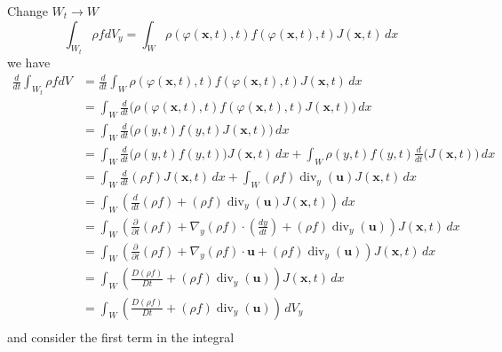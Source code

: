 Change $W_t \to W$
\begin{equation}
\int_{W_t} \rho f dV_y = \int_W \rho (\varphi(\textbf{x},t), t) f(\varphi(\textbf{x},t), t) J(\textbf{x},t)\, dx
\end{equation}
we have
\begin{equation}
\begin{aligned}
\frac{d}{dt}\int_{W_t} \rho f dV
&= \frac{d}{dt} \int_W \rho (\varphi(\textbf{x},t), t) f(\varphi(\textbf{x},t), t) J(\textbf{x},t)\, dx\\
&= \int_W \frac{d}{dt} \bigg(\rho (\varphi(\textbf{x},t), t) f(\varphi(\textbf{x},t), t) J(\textbf{x},t)\bigg)\, dx\\
&= \int_W \frac{d}{dt} \bigg(\rho (y, t) f(y, t) J(\textbf{x},t)\bigg)\, dx\\
&= \int_W \frac{d}{dt} \bigg(\rho (y, t) f(y, t)\bigg) J(\textbf{x},t)\, dx+ \int_W \rho (y, t) f(y, t) \frac{d}{dt} \bigg(J(\textbf{x},t)\bigg)\, dx\\
&= \int_W \frac{d}{dt} \left(\rho f\right) J(\textbf{x},t)\, dx + \int_W (\rho f) \operatorname{div}_y (\textbf{u})J(\textbf{x},t)\, dx\\
&= \int_W \left(\frac{d}{dt} \left(\rho f\right) + (\rho f) \operatorname{div}_y (\textbf{u})J(\textbf{x},t)\right)\, dx\\
&= \int_W \left(
\frac{\partial}{\partial t} (\rho f)
+ \nabla_y (\rho f) \cdot \left(\frac{dy}{dt}\right)
+ (\rho f) \operatorname{div}_y (\textbf{u})
\right)J(\textbf{x},t)\, dx\\
&= \int_W \left(
\frac{\partial}{\partial t} (\rho f)
+ \nabla_y (\rho f) \cdot \textbf{u}
+ (\rho f) \operatorname{div}_y (\textbf{u})
\right)J(\textbf{x},t)\, dx\\
&= \int_W \left(
\frac{D(\rho f)}{D t} + (\rho f) \operatorname{div}_y (\textbf{u})
\right)J(\textbf{x},t)\, dx\\
&= \int_W \left(
\frac{D(\rho f)}{D t} + (\rho f) \operatorname{div}_y (\textbf{u})
\right)\,dV_y\\
\end{aligned}
\end{equation}
and consider the first term in the integral
